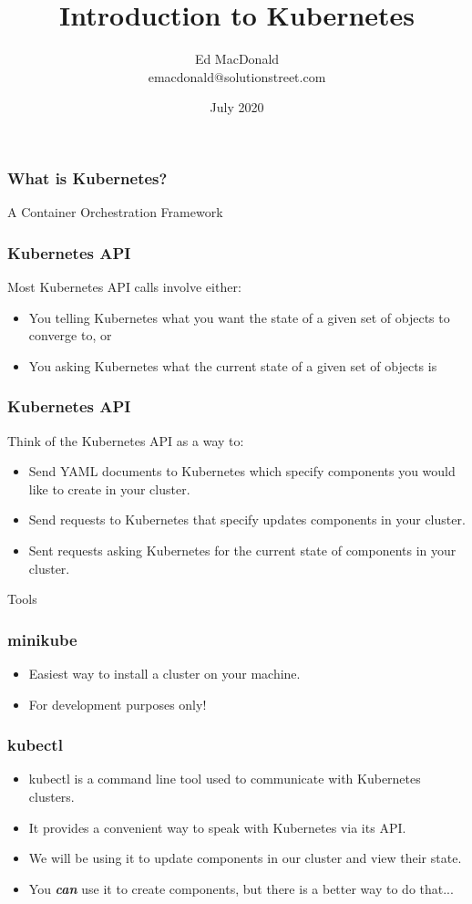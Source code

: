 \documentclass{beamer}
\title[Kubernetes]{Introduction to Kubernetes}
\author[Ed MacDonald]{Ed MacDonald\\emacdonald@solutionstreet.com}
\institute[\href{https://solutionstreet.com/}{SolutionStreet}]{SolutionStreet\\\href{https://solutionstreet.com/}{(solutionstreet.com)}}
\date{July 2020}
\begin{document}
\frame{\titlepage}

\begin{frame}
\frametitle{What is Kubernetes?}
A Container Orchestration Framework
\end{frame}

\begin{frame}
\frametitle{Kubernetes API}
Most Kubernetes API calls involve either:
\begin{itemize}
    \item You telling Kubernetes what you want the state of a given set of objects to converge to, or
    \item You asking Kubernetes what the current state of a given set of objects is
\end{itemize}
\end{frame}

\begin{frame}
\frametitle{Kubernetes API}
Think of the Kubernetes API as a way to:
\begin{itemize}
    \item Send YAML documents to Kubernetes which specify components you would like to create in your cluster.
    \item Send requests to Kubernetes that specify updates components in your cluster.
    \item Sent requests asking Kubernetes for the current state of components in your cluster.
\end{itemize}
\end{frame}

\begin{frame}
    \begin{center}
        \Huge Tools
    \end{center}
\end{frame}

\begin{frame}
    \frametitle{minikube\footnotemark}
    \begin{itemize}
        \item Easiest way to install a cluster on your machine.
        \item For development purposes only!
    \end{itemize}
\end{frame}

\begin{frame}
\frametitle{kubectl\footnotemark}
\begin{itemize}
\item kubectl is a command line tool used to communicate with Kubernetes clusters.
\item It provides a convenient way to speak with Kubernetes via its API.
\item We will be using it to update components in our cluster and view their state.
\item You \textbf{\textit{can}} use it to create components, but there is a better way to do that...
\end{itemize}
\end{frame}
\end{document}
